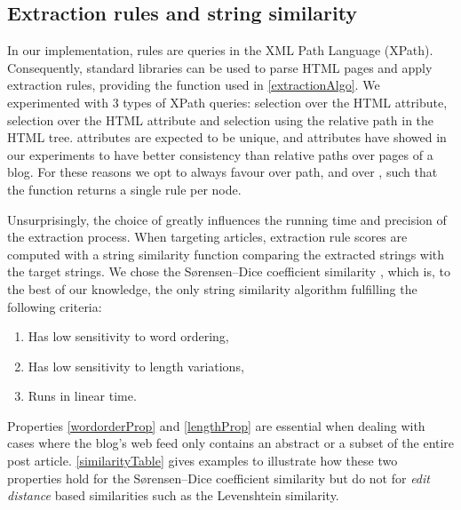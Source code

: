\subsection{Extraction rules and string similarity}
\label{extractionrulesandstringsimilarity}

In our implementation, rules are queries in the XML Path Language (XPath). Consequently, standard libraries can be used to parse HTML pages and apply extraction rules, providing the  function used in \autoref{extractionAlgo}. We experimented with 3 types of XPath queries: selection over the HTML  attribute, selection over the HTML  attribute and selection using the relative path in the HTML tree.  attributes are expected to be unique, and  attributes have showed in our experiments to have better consistency than relative paths over pages of a blog. For these reasons we opt to always favour  over path, and  over , such that the  function returns a single rule per node.

\allrulesAlgo

Unsurprisingly, the choice of  greatly influences the running time and precision of the extraction process. When targeting articles, extraction rule scores are computed with a string similarity function comparing the extracted strings with the target strings. We chose the Sørensen–Dice coefficient similarity \cite{dice1945}, which is, to the best of our knowledge, the only string similarity algorithm fulfilling the following criteria:

\begin{enumerate}
  \item\label{wordorderProp} Has low sensitivity to word ordering,
  \item\label{lengthProp} Has low sensitivity to length variations,
  \item\label{linearProp} Runs in linear time.
\end{enumerate}

Properties \ref{wordorderProp} and \ref{lengthProp} are essential when dealing with cases where the blog's web feed only contains an abstract or a subset of the entire post article. \autoref{similarityTable} gives examples to illustrate how these two properties hold for the Sørensen–Dice coefficient similarity but do not for \emph{edit distance} based similarities such as the Levenshtein \cite{levenshtein1966} similarity.

